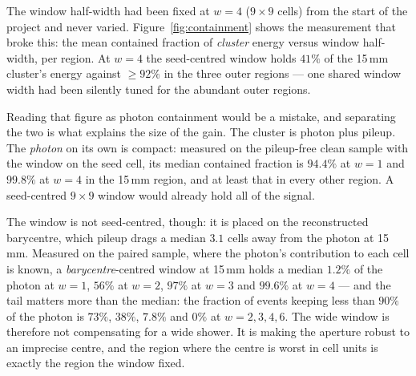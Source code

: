 \documentclass[11pt,a4paper]{article}
\begin{document}
The window half-width had been fixed at $w{=}4$ ($9{\times}9$ cells) from
the start of the project and never varied. Figure~\ref{fig:containment}
shows the measurement that broke this: the mean contained fraction of
\emph{cluster} energy versus window half-width, per region. At $w{=}4$ the
seed-centred window holds $41\%$ of the 15\,mm cluster's energy against
$\geq 92\%$ in the three outer regions --- one shared window width had been
silently tuned for the abundant outer regions.

Reading that figure as photon containment would be a mistake, and
separating the two is what explains the size of the gain. The cluster is
photon plus pileup. The \emph{photon} on its own is compact: measured on
the pileup-free clean sample with the window on the seed cell, its median
contained fraction is $94.4\%$ at $w{=}1$ and $99.8\%$ at $w{=}4$ in the
15\,mm region, and at least that in every other region. A seed-centred
$9{\times}9$ window would already hold all of the signal.

The window is not seed-centred, though: it is placed on the reconstructed
barycentre, which pileup drags a median $3.1$ cells away from the photon at
15\,mm. Measured on the paired sample, where the photon's contribution to
each cell is known, a \emph{barycentre}-centred window at 15\,mm holds a
median $1.2\%$ of the photon at $w{=}1$, $56\%$ at $w{=}2$, $97\%$ at
$w{=}3$ and $99.6\%$ at $w{=}4$ --- and the tail matters more than the
median: the fraction of events keeping less than $90\%$ of the photon is
$73\%$, $38\%$, $7.8\%$ and $0\%$ at $w{=}2,3,4,6$. The wide window is
therefore not compensating for a wide shower. It is making the aperture
robust to an imprecise centre, and the region where the centre is worst in
cell units is exactly the region the window fixed.
\end{document}
